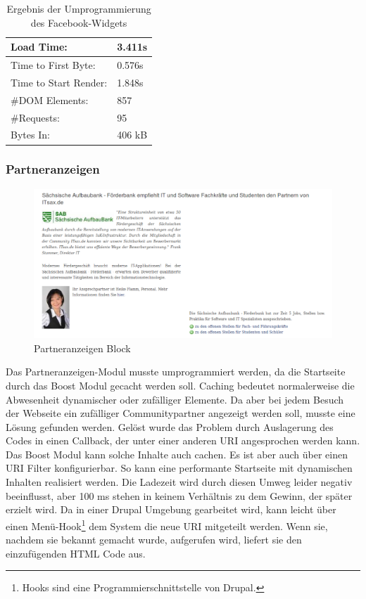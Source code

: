 \begin{table}[!ht]
\centering
\caption{Ergebnis der Umprogrammierung des Facebook-Widgets}
    \begin{tabular}{ | p{3cm} | p{1.5cm} | }
    \hline
    Load Time: 			& 3.411s 	\\ \hline
    Time to First Byte:		& 0.576s  	\\ \hline
    Time to Start Render:	& 1.848s	\\ \hline
    \#DOM Elements:		& 857 		\\ \hline
    \#Requests:			& 95 		\\ \hline
    Bytes In:			& 406 kB 	\\ \hline
    \hline
    \end{tabular}
\end{table}


\subsubsection{Partneranzeigen}
\begin{figure}[!ht]
  \centering
  \includegraphics[width=1.1\textwidth]{material/partneranzeigen.png}
  \caption{Partneranzeigen Block}
  \label{fig:partneranzeigen}
\end{figure}
Das Partneranzeigen-Modul musste umprogrammiert werden, da die Startseite durch das Boost Modul gecacht werden soll. Caching bedeutet normalerweise die Abwesenheit dynamischer oder zufälliger Elemente. Da aber bei jedem Besuch der Webseite ein zufälliger Communitypartner angezeigt werden soll, musste eine Lösung gefunden werden. Gelöst wurde das Problem durch Auslagerung des Codes in einen Callback, der unter einer anderen URI angesprochen werden kann. Das Boost Modul kann solche Inhalte auch cachen. Es ist aber auch über einen URI Filter konfigurierbar. So kann eine performante Startseite mit dynamischen Inhalten realisiert werden. Die Ladezeit wird durch diesen Umweg leider negativ beeinflusst, aber 100 ms stehen in keinem Verhältnis zu dem Gewinn, der später erzielt wird. Da in einer Drupal Umgebung gearbeitet wird, kann leicht über einen Menü-Hook\footnote{Hooks sind eine Programmierschnittstelle von Drupal.} dem System die neue URI mitgeteilt werden. Wenn sie, nachdem sie bekannt gemacht wurde, aufgerufen wird, liefert sie den einzufügenden HTML Code aus.

